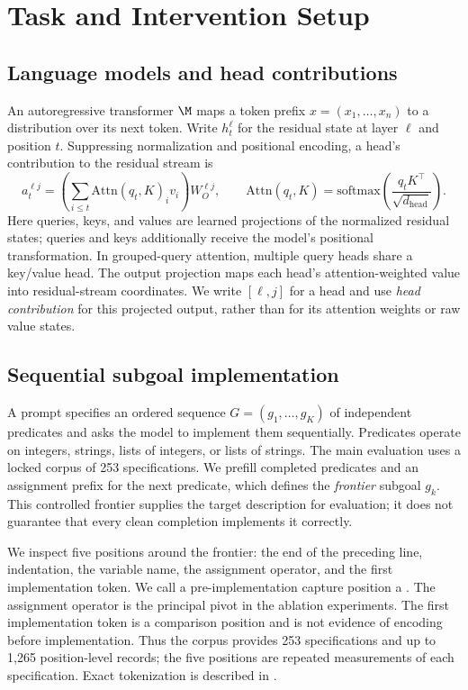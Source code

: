 \section{Task and Intervention Setup}
\label{sec:notations}

\subsection{Language models and head contributions}
\label{sec:notations:lm}
An autoregressive transformer $\M$ maps a token prefix $x=(x_1,\ldots,x_n)$ to a distribution over its next token. Write $h_t^\ell$ for the residual state at layer $\ell$ and position $t$. Suppressing normalization and positional encoding, a head's contribution to the residual stream is
\begin{equation}
a_t^{\ell j}=\left(\sum_{i\leq t}\mathrm{Attn}(q_t,K)_i v_i\right)W_O^{\ell j},
\qquad \mathrm{Attn}(q_t,K)=\mathrm{softmax}\!\left(\frac{q_tK^\top}{\sqrt{d_{\mathrm{head}}}}\right).
\label{eq:head}
\end{equation}
Here queries, keys, and values are learned projections of the normalized residual states; queries and keys additionally receive the model's positional transformation. In grouped-query attention, multiple query heads share a key/value head. The output projection maps each head's attention-weighted value into residual-stream coordinates. We write $[\ell,j]$ for a head and use \emph{head contribution} for this projected output, rather than for its attention weights or raw value states.

\subsection{Sequential subgoal implementation}
\label{sec:notations:task}
A prompt specifies an ordered sequence $G=(g_1,\ldots,g_K)$ of independent predicates and asks the model to implement them sequentially. Predicates operate on integers, strings, lists of integers, or lists of strings. The main evaluation uses a locked corpus of 253 specifications. We prefill completed predicates and an assignment prefix for the next predicate, which defines the \emph{frontier} subgoal $g_k$. This controlled frontier supplies the target description for evaluation; it does not guarantee that every clean completion implements it correctly.

We inspect five positions around the frontier: the end of the preceding line, indentation, the variable name, the assignment operator, and the first implementation token. We call a pre-implementation capture position a \pivot. The assignment operator is the principal pivot in the ablation experiments. The first implementation token is a comparison position and is not evidence of encoding before implementation. Thus the corpus provides 253 specifications and up to 1,265 position-level records; the five positions are repeated measurements of each specification. Exact tokenization is described in .

